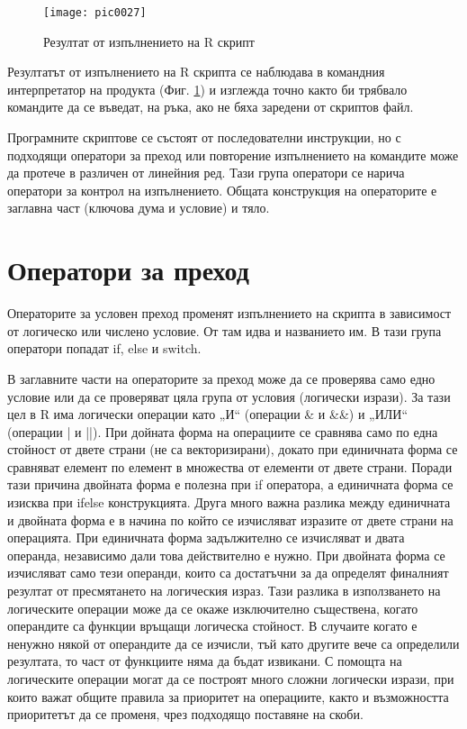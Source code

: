 \begin{figure}[h!]
  \centering
  \texttt{[image: pic0027]}
  \caption{Резултат от изпълнението на R скрипт}
\label{figure0027}
\end{figure}
\FloatBarrier

Резултатът от изпълнението на R скрипта се наблюдава в командния интерпретатор на продукта (Фиг. \ref{figure0027}) и изглежда точно както би трябвало командите да се въведат, на ръка, ако не бяха заредени от скриптов файл.

Програмните скриптове се състоят от последователни инструкции, но с подходящи оператори за преход или повторение изпълнението на командите може да протече в различен от линейния ред. Тази група оператори се нарича оператори за контрол на изпълнението. Общата конструкция на операторите е заглавна част (ключова дума и условие) и тяло. 

\section{Оператори за преход}

Операторите за условен преход променят изпълнението на скрипта в зависимост от логическо или числено условие. От там идва и названието им. В тази група оператори попадат if, else и switch.

В заглавните части на операторите за преход може да се проверява само едно условие или да се проверяват цяла група от условия (логически изрази). За тази цел в R има логически операции като „И“ (операции \& и \&\&) и „ИЛИ“ (операции | и ||). При дойната форма на операциите се сравнява само по една стойност от двете страни (не са векторизирани), докато при единичната форма се сравняват елемент по елемент в множества от елементи от двете страни. Поради тази причина двойната форма е полезна при if оператора, а единичната форма се изисква при ifelse конструкцията. Друга много важна разлика между единичната и двойната форма е в начина по който се изчисляват изразите от двете страни на операцията. При единичната форма задължително се изчисляват и двата операнда, независимо дали това действително е нужно. При двойната форма се изчисляват само тези операнди, които са достатъчни за да определят финалният резултат от пресмятането на логическия израз. Тази разлика в използването на логическите операции може да се окаже изключително съществена, когато операндите са функции връщащи логическа стойност. В случаите когато е ненужно някой от операндите да се изчисли, тъй като другите вече са определили резултата, то част от функциите няма да бъдат извикани. С помощта на логическите операции могат да се построят много сложни логически изрази, при които важат общите правила за приоритет на операциите, както и възможността приоритетът да се променя, чрез подходящо поставяне на скоби. 

